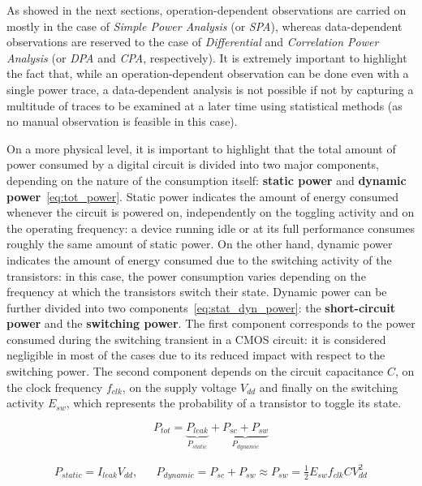         As showed in the next sections, operation-dependent observations are carried on mostly in the case of \emph{Simple Power Analysis} (or \emph{SPA}), whereas data-dependent observations are reserved to the case of \emph{Differential} and \emph{Correlation Power Analysis} (or \emph{DPA} and \emph{CPA}, respectively). It is extremely important to highlight the fact that, while an operation-dependent observation can be done even with a single power trace, a data-dependent analysis is not possible if not by capturing a multitude of traces to be examined at a later time using statistical methods (as no manual observation is feasible in this case).

        \bigskip
        
        On a more physical level, it is important to highlight that the total amount of power consumed by a digital circuit is divided into two major components, depending on the nature of the consumption itself: \textbf{static power} and \textbf{dynamic power}~\ref{eq:tot_power}.
        Static power indicates the amount of energy consumed whenever the circuit is powered on, independently on the toggling activity and on the operating frequency: a device running idle or at its full performance consumes roughly the same amount of static power. On the other hand, dynamic power indicates the amount of energy consumed due to the switching activity of the transistors: in this case, the power consumption varies depending on the frequency at which the transistors switch their state. Dynamic power can be further divided into two components~\ref{eq:stat_dyn_power}: the \textbf{short-circuit power} and the \textbf{switching power}. The first component corresponds to the power consumed during the switching transient in a CMOS circuit: it is considered negligible in most of the cases due to its reduced impact with respect to the switching power. The second component depends on the circuit capacitance $C$, on the clock frequency $f_{clk}$, on the supply voltage $V_{dd}$ and finally on the switching activity $E_{sw}$, which represents the probability of a transistor to toggle its state.

        \begin{equation}\label{eq:tot_power}
            P_{tot} = \underbrace{P_{leak}}_{P_{static}} + \underbrace{P_{sc} + P_{sw}}_{P_{dynamic}}
        \end{equation}

        \begin{align}\label{eq:stat_dyn_power}
            P_{static} = I_{leak} V_{dd}, && P_{dynamic} = P_{sc} + P_{sw} \approx P_{sw} = \frac{1}{2} E_{sw} f_{clk} C V_{dd}^2
        \end{align}

